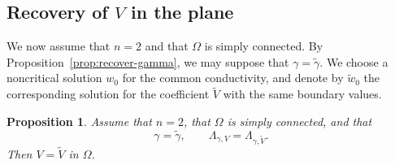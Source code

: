 \documentclass[a4paper,12pt]{article}
\newtheorem{prop}[thm]{Proposition}
\theoremstyle{definition}
\theoremstyle{remark}
\begin{document}
\subsection{Recovery of $V$ in the plane}

We now assume that $n=2$ and that $\Omega$ is simply connected. By Proposition~\ref{prop:recover-gamma}, we may suppose that $\gamma=\tilde\gamma$. We choose a noncritical solution $w_0$ for the common conductivity, and denote by $\tilde w_0$ the corresponding solution for the coefficient $\tilde V$ with the same boundary values.

\begin{prop}\label{prop:recover-V-2d}
Assume that $n=2$, that $\Omega$ is simply connected, and that
\[
\gamma=\tilde\gamma,
\qquad
\Lambda_{\gamma,V}=\Lambda_{\gamma,\tilde V}.
\]
Then $V=\tilde V$ in $\Omega$.
\end{prop}
\end{document}
